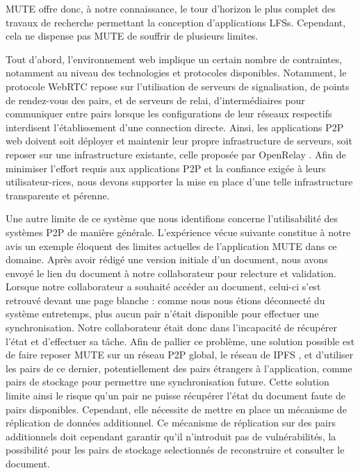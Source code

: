 \ac{MUTE} offre donc, à notre connaissance, le tour d'horizon le plus complet des travaux de recherche permettant la conception d'applications \acp{LFS}.
Cependant, cela ne dispense pas \ac{MUTE} de souffrir de plusieurs limites.

Tout d'abord, l'environnement web implique un certain nombre de contraintes, notamment au niveau des technologies et protocoles disponibles.
Notamment, le protocole WebRTC repose sur l'utilisation de serveurs de signalisation, \ie de points de rendez-vous des pairs, et de serveurs de relai, \ie d'intermédiaires pour communiquer entre pairs lorsque les configurations de leur réseaux respectifs interdisent l'établissement d'une connection directe.
Ainsi, les applications \ac{P2P} web doivent soit déployer et maintenir leur propre infrastructure de serveurs, soit reposer sur une infrastructure existante, \eg celle proposée par OpenRelay \cite{openrelay}.
Afin de minimiser l'effort requis aux applications \ac{P2P} et la confiance exigée à leurs utilisateur-rices, nous devons supporter la mise en place d'une telle infrastructure transparente et pérenne.

Une autre limite de ce système que nous identifions concerne l'utilisabilité des systèmes \ac{P2P} de manière générale.
L'expérience vécue suivante constitue à notre avis un exemple éloquent des limites actuelles de l'application \ac{MUTE} dans ce domaine.
Après avoir rédigé une version initiale d'un document, nous avons envoyé le lien du document à notre collaborateur pour relecture et validation.
Lorsque notre collaborateur a souhaité accéder au document, celui-ci s'est retrouvé devant une page blanche : comme nous nous étions déconnecté du système entretemps, \ie plus aucun pair n'était disponible pour effectuer une synchronisation.
Notre collaborateur était donc dans l'incapacité de récupérer l'état et d'effectuer sa tâche.
Afin de pallier ce problème, une solution possible est de faire reposer \ac{MUTE} sur un réseau \ac{P2P} global, \eg le réseau de \ac{IPFS} \cite{ipfs}, et d'utiliser les pairs de ce dernier, potentiellement des pairs étrangers à l'application, comme pairs de stockage pour permettre une synchronisation future.
Cette solution limite ainsi le risque qu'un pair ne puisse récupérer l'état du document faute de pairs disponibles.
Cependant, elle nécessite de mettre en place un mécanisme de réplication de données additionnel.
Ce mécanisme de réplication sur des pairs additionnels doit cependant garantir qu'il n'introduit pas de vulnérabilités, \eg la possibilité pour les pairs de stockage selectionnés de reconstruire et consulter le document.
